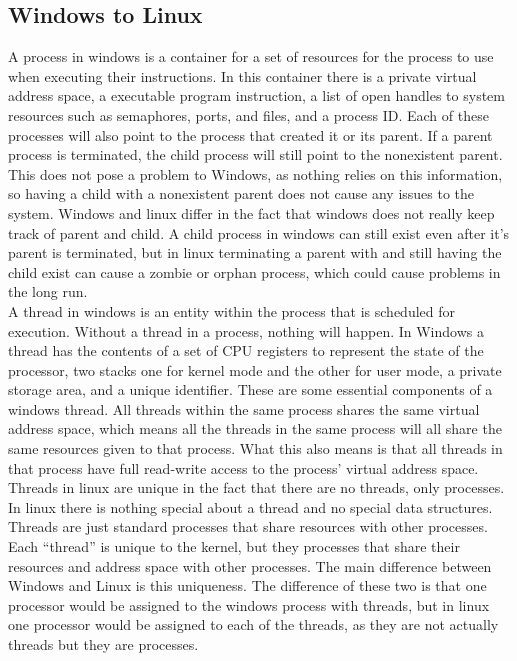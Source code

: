 \documentclass[onecolumn, draftclsnofoot, 10pt, titlepage, compsoc]{IEEEtran}
\begin{document}
\subsection{Windows to Linux}
A process in windows is a container for a set of resources for the process to use when executing their instructions. In this container there is a private virtual address space, a executable program instruction, a list of open handles to system resources such as semaphores, ports, and files, and a process ID. Each of these processes will also point to the process that created it or its parent. If a parent process is terminated, the child process will still point to the nonexistent parent. This does not pose a problem to Windows, as nothing relies on this information, so having a child with a nonexistent parent does not cause any issues to the system. Windows and linux differ in the fact that windows does not really keep track of parent and child. A child process in windows can still exist even after it’s parent is terminated, but in linux terminating a parent with and still having the child exist can cause a zombie or orphan process, which could cause problems in the long run.\\
A thread in windows is an entity within the process that is scheduled for execution. Without a thread in a process, nothing will happen. In Windows a thread has the contents of a set of CPU registers to represent the state of the processor, two stacks one for kernel mode and the other for user mode, a private storage area, and a unique identifier. These are some essential components of a windows thread. All threads within the same process shares the same virtual address space, which means all the threads in the same process will all share the same resources given to that process. What this also means is that all threads in that process have full read-write access to the process’ virtual address space. Threads in linux are unique in the fact that there are no threads, only processes. In linux there is nothing special about a thread and no special data structures. Threads are just standard processes that share resources with other processes. Each “thread” is unique to the kernel, but they processes that share their resources and address space with other processes. The main difference between Windows and Linux is this uniqueness. The difference of these two is that one processor would be assigned to the windows process with threads, but in linux one processor would be assigned to each of the threads, as they are not actually threads but they are processes.\\
\end{document}
